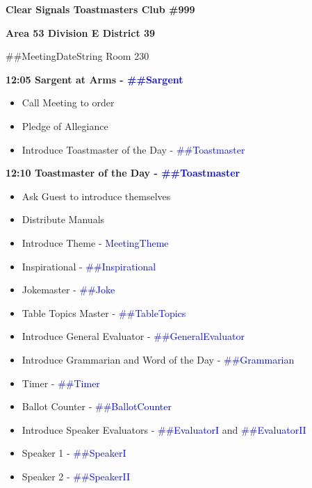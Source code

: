 \documentclass{article}
\newcommand{\meetingTheme}{MeetingTheme}
\newcommand{\meetingDateString}{##MeetingDateString}
\newcommand{\toastmaster}{##Toastmaster}
\newcommand{\sargent}{##Sargent}
\newcommand{\tableTopics}{##TableTopics}
\newcommand{\generalEvaluator}{##GeneralEvaluator}
\newcommand{\evaluatorI}{##EvaluatorI}
\newcommand{\evaluatorII}{##EvaluatorII}
\newcommand{\speakerI}{##SpeakerI}
\newcommand{\speakerII}{##SpeakerII}
\newcommand{\grammarian}{##Grammarian}
\newcommand{\timer}{##Timer}
\newcommand{\inspirational}{##Inspirational}
\newcommand{\ballotCounter}{##BallotCounter}
\newcommand{\joke}{##Joke}
\begin{document}
  \begin{spacing}{.8}
  \begin{center}
    {\bf Clear Signals Toastmasters Club \#999}
	
	{\bf Area 53 Division E District 39}
	
	\meetingDateString{} Room 230  
  \end{center}
  {\Large \bf12:05 Sargent at Arms - \textcolor{blue}{\sargent{}}}
  \begin{itemize}
    \item Call Meeting to order
    \item Pledge of Allegiance
    \item Introduce Toastmaster of the Day - \textcolor{blue}{\toastmaster{}}
  \end{itemize}
  {\Large \bf12:10 Toastmaster of the Day - \textcolor{blue}{\toastmaster{}}} 
  \begin{itemize}
    \item Ask Guest to introduce themselves
    \item Distribute Manuals
    \item Introduce Theme - \textcolor{blue}{\meetingTheme{}}
    \item Inspirational - \textcolor{blue}{\inspirational{}}
    \item Jokemaster - \textcolor{blue}{\joke{}}
	\item Table Topics Master - \textcolor{blue}{\tableTopics{}}
    \item Introduce General Evaluator - \textcolor{blue}{\generalEvaluator{}}
	\item Introduce Grammarian and Word of the Day - \textcolor{blue}{\grammarian{}}
    \item Timer - \textcolor{blue}{\timer{}}
    \item Ballot Counter - \textcolor{blue}{\ballotCounter{}}
    \item Introduce Speaker Evaluators - \textcolor{blue}{\evaluatorI{}} and \textcolor{blue}{\evaluatorII{}}
    \item Speaker 1 - \textcolor{blue}{\speakerI{}}
    \item Speaker 2 - \textcolor{blue}{\speakerII{}}
      \begin{description}

\end{description}
\end{itemize}
\end{spacing}
\end{document}
